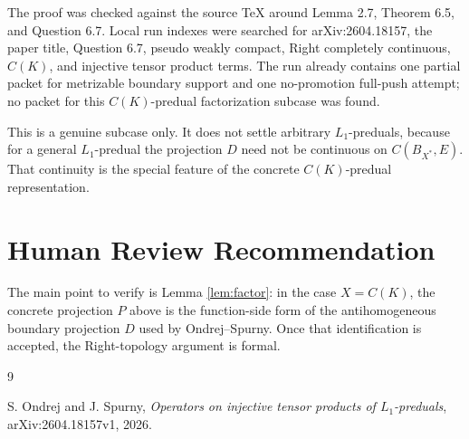 \documentclass[11pt]{article}
\begin{document}
The proof was checked against the source TeX around Lemma 2.7, Theorem 6.5,
and Question 6.7.  Local run indexes were searched for arXiv:2604.18157,
the paper title, Question 6.7, pseudo weakly compact, Right completely
continuous, \(C(K)\), and injective tensor product terms.  The run already
contains one partial packet for metrizable boundary support and one
no-promotion full-push attempt; no packet for this \(C(K)\)-predual
factorization subcase was found.

This is a genuine subcase only.  It does not settle arbitrary \(L_1\)-preduals,
because for a general \(L_1\)-predual the projection \(D\) need not be
continuous on \(C(B_{X^*},E)\).  That continuity is the special feature of the
concrete \(C(K)\)-predual representation.

\section*{Human Review Recommendation}

The main point to verify is Lemma \ref{lem:factor}: in the case
\(X=C(K)\), the concrete projection \(P\) above is the function-side form of
the antihomogeneous boundary projection \(D\) used by Ondrej--Spurny.  Once
that identification is accepted, the Right-topology argument is formal.

\begin{thebibliography}{9}

S. Ondrej and J. Spurny,
\emph{Operators on injective tensor products of \(L_1\)-preduals},
arXiv:2604.18157v1, 2026.

\end{thebibliography}
\end{document}
